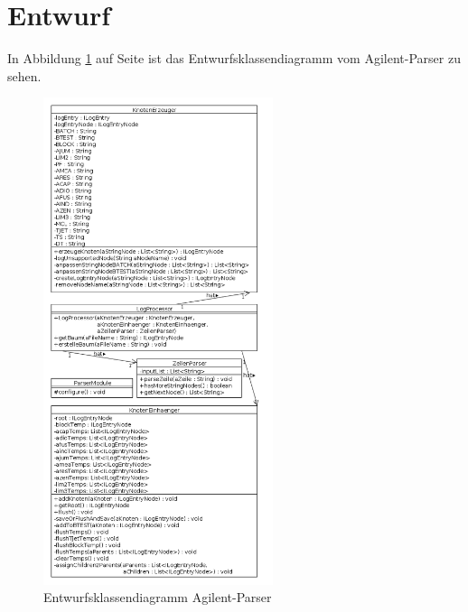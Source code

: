\section{Entwurf}\label{Entwurf}
In Abbildung \ref{fig:Entwurfsklassendiagramm} auf Seite \pageref{fig:Entwurfsklassendiagramm} ist das Entwurfsklassendiagramm vom Agilent-Parser zu sehen.

\begin{figure}[htp]
\centering
\includegraphics[width=0.6\textwidth]{Ingo/Bilder/Entwurfsklassendiagramm.png}
\caption{Entwurfsklassendiagramm Agilent-Parser}
\label{fig:Entwurfsklassendiagramm}
\end{figure}